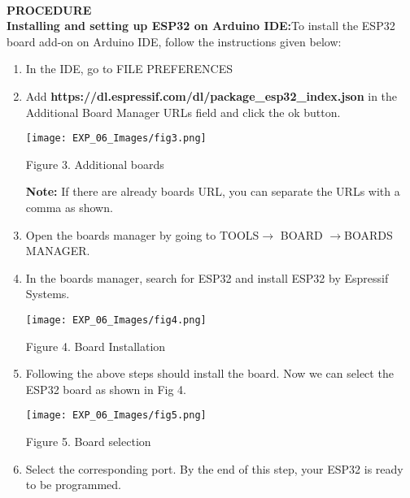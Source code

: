 \documentclass[12pt,a4paper]{article}
\begin{document}
\setlength{\parindent}{0eM}
\\[21pt]\textbf{\large PROCEDURE}\\[6pt]
\textbf{Installing and setting up ESP32 on Arduino IDE:}To install the ESP32 board add-on on Arduino IDE, follow the instructions given below:

\begin{enumerate}
\setlength\itemsep{-0.3em}
\item{In the IDE, go to FILE  \rightarrow  PREFERENCES}\\

\item{Add \textbf{https://dl.espressif.com/dl/package\_esp32\_index.json} in the Additional Board Manager URLs field and click the ok button.}

\begin{center} 
\texttt{[image: EXP\_06\_Images/fig3.png]}
\end{center}
\begin{center} {Figure 3. Additional boards}\end{center}
\textbf{Note:} If there are already boards URL, you can separate the URLs with a comma as shown.

\item{ Open the boards manager by going to TOOLS$\rightarrow$  BOARD $\rightarrow$BOARDS MANAGER.}

\item{In the boards manager, search for ESP32 and install ESP32 by Espressif Systems.}

\begin{center} 
\texttt{[image: EXP\_06\_Images/fig4.png]}
\end{center}
\begin{center} {Figure 4. Board Installation }\end{center}


\item Following the above steps should install the board. Now we can select the ESP32 board as shown in Fig 4.
\begin{center} 
\texttt{[image: EXP\_06\_Images/fig5.png]}
\end{center}
\begin{center} {Figure 5. Board selection}\end{center}

\item Select the corresponding port. By the end of this step, your ESP32 is ready to be programmed.

\end{enumerate}
\end{document}
